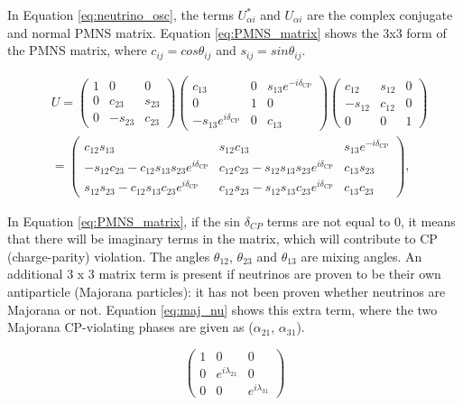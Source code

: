 In Equation \ref{eq:neutrino_osc}, the terms $U_{\alpha i}^{*}$ and $U_{\alpha i}$ are the complex conjugate and normal PMNS matrix. Equation \ref{eq:PMNS_matrix} shows the 3x3 form of the PMNS matrix, where $c_{ij} = cos {\theta_{ij}}$ and $s_{ij} = sin {\theta_{ij}}$.

$$
\begin{aligned}
&U=\left(\begin{array}{ccc}
1 & 0 & 0 \\
0 & c_{23} & s_{23} \\
0 & -s_{23} & c_{23}
\end{array}\right)\left(\begin{array}{ccc}
c_{13} & 0 & s_{13} e^{-i \delta_{\mathrm{CP}}} \\
0 & 1 & 0 \\
-s_{13} e^{i \delta_{\mathrm{CP}}} & 0 & c_{13}
\end{array}\right)\left(\begin{array}{ccc}
c_{12} & s_{12} & 0 \\
-s_{12} & c_{12} & 0 \\
0 & 0 & 1
\end{array}\right)\\
&=\left(\begin{array}{ccc}
c_{12} s_{13} & s_{12} c_{13} & s_{13} e^{-i \delta_{\mathrm{CP}}} \\
-s_{12} c_{23}-c_{12} s_{13} s_{23} e^{i \delta_{\mathrm{CP}}} & c_{12} c_{23}-s_{12} s_{13} s_{23} e^{i \delta_{\mathrm{CP}}} & c_{13} s_{23} \\
s_{12} s_{23}-c_{12} s_{13} c_{23} e^{i \delta_{\mathrm{CP}}} & c_{12} s_{23}-s_{12} s_{13} c_{23} e^{i \delta_{\mathrm{CP}}} & c_{13} c_{23}
\end{array}\right),
\end{aligned}
\label{eq:PMNS_matrix}
$$

In Equation \ref{eq:PMNS_matrix}, if the sin $\delta_{CP}$ terms are not equal to 0, it means that there will be imaginary terms in the matrix, which will contribute to CP (charge-parity) violation. The angles $\theta_{12}$, $\theta_{23}$ and $\theta_{13}$ are mixing angles. An additional 3 x 3 matrix term is present if neutrinos are proven to be their own antiparticle (Majorana particles): it has not been proven whether neutrinos are Majorana or not. Equation \ref{eq:maj_nu} shows this extra term, where the two Majorana CP-violating phases are given as ($\alpha_{21}$, $\alpha_{31}$). 

$$
\left(\begin{array}{ccc}
1 & 0 & 0 \\
0 & e^{i \lambda_{21}} & 0 \\
0 & 0 & e^{i \lambda_{31}}
\end{array}\right)
\label{eq:maj_nu}
$$

